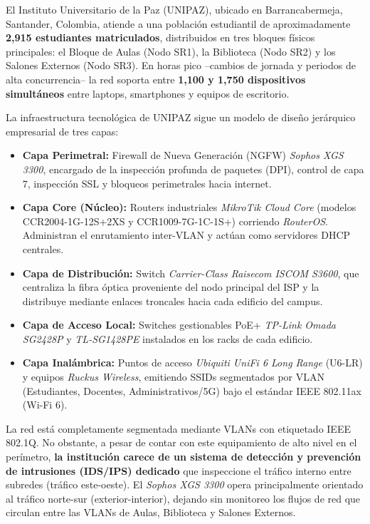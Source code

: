 \documentclass[12pt, letterpaper, oneside]{report}
\begin{document}
El Instituto Universitario de la Paz (\textsc{UNIPAZ}), ubicado en Barrancabermeja, Santander, Colombia, atiende a una población estudiantil de aproximadamente \textbf{2,915 estudiantes matriculados}, distribuidos en tres bloques físicos principales: el Bloque de Aulas (Nodo SR1), la Biblioteca (Nodo SR2) y los Salones Externos (Nodo SR3). En horas pico --cambios de jornada y periodos de alta concurrencia-- la red soporta entre \textbf{1,100 y 1,750 dispositivos simultáneos} entre laptops, smartphones y equipos de escritorio.

La infraestructura tecnológica de \textsc{UNIPAZ} sigue un modelo de diseño jerárquico empresarial de tres capas:

\begin{itemize}[leftmargin=*]
  \item \textbf{Capa Perimetral:} Firewall de Nueva Generación (NGFW) \textit{Sophos XGS 3300}, encargado de la inspección profunda de paquetes (DPI), control de capa 7, inspección SSL y bloqueos perimetrales hacia internet.
  \item \textbf{Capa Core (Núcleo):} Routers industriales \textit{MikroTik Cloud Core} (modelos CCR2004-1G-12S+2XS y CCR1009-7G-1C-1S+) corriendo \textit{RouterOS}. Administran el enrutamiento inter-VLAN y actúan como servidores DHCP centrales.
  \item \textbf{Capa de Distribución:} Switch \textit{Carrier-Class Raisecom ISCOM S3600}, que centraliza la fibra óptica proveniente del nodo principal del ISP y la distribuye mediante enlaces troncales hacia cada edificio del campus.
  \item \textbf{Capa de Acceso Local:} Switches gestionables PoE+ \textit{TP-Link Omada SG2428P} y \textit{TL-SG1428PE} instalados en los racks de cada edificio.
  \item \textbf{Capa Inalámbrica:} Puntos de acceso \textit{Ubiquiti UniFi 6 Long Range} (U6-LR) y equipos \textit{Ruckus Wireless}, emitiendo SSIDs segmentados por VLAN (Estudiantes, Docentes, Administrativos/5G) bajo el estándar IEEE 802.11ax (Wi-Fi 6).
\end{itemize}

La red está completamente segmentada mediante VLANs con etiquetado IEEE 802.1Q. No obstante, a pesar de contar con este equipamiento de alto nivel en el perímetro, \textbf{la institución carece de un sistema de detección y prevención de intrusiones (IDS/IPS) dedicado} que inspeccione el tráfico interno entre subredes (tráfico este-oeste). El \textit{Sophos XGS 3300} opera principalmente orientado al tráfico norte-sur (exterior-interior), dejando sin monitoreo los flujos de red que circulan entre las VLANs de Aulas, Biblioteca y Salones Externos.
\end{document}
